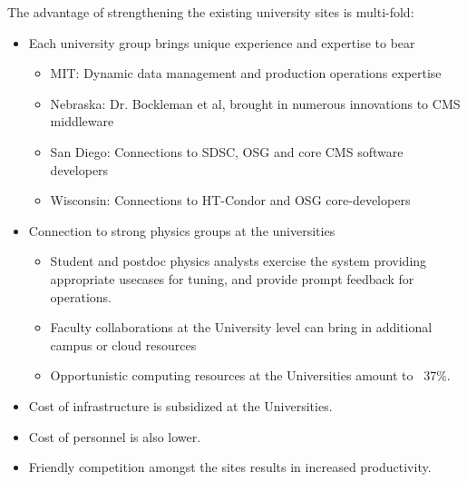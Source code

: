 \documentclass[11pt,a4paper]{article}
\begin{document}
The advantage of strengthening the existing university sites is multi-fold:
\begin{itemize}
\item Each university group brings unique experience and expertise to bear
\begin{itemize}
\item MIT: Dynamic data management and production operations expertise
\item Nebraska: Dr. Bockleman et al, brought in numerous innovations to CMS middleware
\item San Diego: Connections to SDSC, OSG and core CMS software developers
\item Wisconsin: Connections to HT-Condor and OSG core-developers
\end{itemize}
\item Connection to strong physics groups at the universities
\begin{itemize}
\item Student and postdoc physics analysts exercise the system providing
appropriate usecases for tuning, and provide prompt feedback for operations.
\item Faculty collaborations at the University level can bring in additional
campus or cloud resources
\item Opportunistic computing resources at the Universities amount to ~37\%.
\end{itemize}
\item Cost of infrastructure is subsidized at the Universities.
\item Cost of personnel is also lower.
\item Friendly competition amongst the sites results in increased productivity.
\end{itemize}


\end{document}
